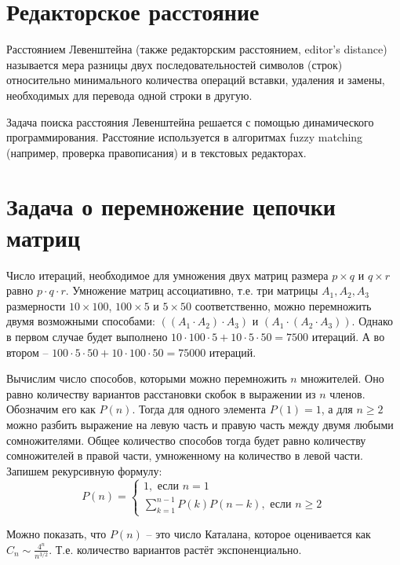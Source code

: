 \documentclass[a4paper,11pt]{article}
\begin{document}
\section{Редакторское расстояние}
Расстоянием Левенштейна (также редакторским расстоянием, editor's distance)
называется мера разницы двух последовательностей символов (строк)
относительно минимального количества операций вставки, удаления и замены,
необходимых для перевода одной строки в другую.

Задача поиска расстояния Левенштейна решается с помощью динамического
программирования. Расстояние используется в алгоритмах fuzzy matching
(например, проверка правописания) и в текстовых редакторах.

\section{Задача о перемножение цепочки матриц}
Число итераций, необходимое для умножения двух матриц размера $p \times q$
и $q \times r$ равно $p \cdot q \cdot r$. Умножение матриц ассоциативно,
т.е. три матрицы $A_1, A_2, A_3$ размерности
$10 \times 100$, $100 \times 5$ и $5 \times 50$ соответственно, можно
перемножить двумя возможными способами: $((A_1 \cdot A_2) \cdot A_3)$ и
$(A_1 \cdot (A_2 \cdot A_3))$. Однако в первом случае будет выполнено 
$10 \cdot 100 \cdot 5 + 10 \cdot 5 \cdot 50 = 7500$ итераций. А во втором
-- $100 \cdot 5 \cdot 50 + 10 \cdot 100 \cdot 50 = 75000$ итераций.

Вычислим число способов, которыми можно перемножить $n$ множителей. Оно
равно количеству вариантов расстановки скобок в выражении из $n$ членов.
Обозначим его как $P(n)$. Тогда для одного элемента $P(1) = 1$, а для 
$n \geqslant 2$ можно разбить выражение на левую часть и правую часть
между двумя любыми сомножителями. Общее количество способов тогда 
будет равно количеству сомножителей в правой части, умноженному на
количество в левой части. Запишем рекурсивную формулу:
\begin{equation*}
  P(n) = \begin{cases}
    1, \text{ если } n = 1 \\
    \sum_{k=1}^{n-1} P(k) P(n-k), \text{ если } n \geqslant 2
    \end{cases}
\end{equation*}

Можно показать, что $P(n)$ -- это число Каталана, которое оценивается как
$C_n \sim \frac{4^n}{n^{3/2}}$. Т.е. количество вариантов растёт
экспоненциально.
\end{document}
